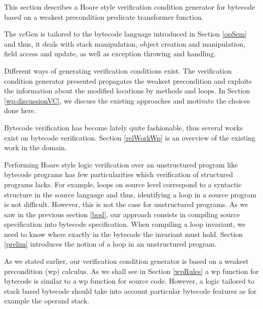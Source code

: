 
This section describes a Hoare style verification condition generator for bytecode based on a weakest precondition predicate transformer function.
 

The vcGen is tailored to the bytecode language introduced in Section \ref{opSem} and thus, it deals
with stack manipulation, object creation and manipulation, field access and update, as well as exception throwing and handling.

Different ways of generating verification conditions exist. The verification condition
 generator presented  propagates the weakest precondition and exploits the information 
about the modified locations by methods and loops. 
In Section \ref{wp:discussionVC}, we discuss the existing approaches and motivate the choices done here.

Bytecode verification has become lately quite fashionable, thus several works exist on bytecode verification. Section \ref{relWorkWp}
is an overview of the existing work in the domain.



Performing Hoare style logic verification over an unstructured program like bytecode programs has few particularities which
verification of structured programs lacks. For example, loops on source level correspond to a syntactic structure in the source language and thus, identifying
a loop in a source program is not difficult.  However, this is not the case for unstructured programs. 
As we saw in the previous section \ref{bcsl}, our approach consists in compiling source specification into
bytecode specification. When compiling a loop invariant, we need to know where exactly in the bytecode the invariant must hold.
Section \ref{prelim} introduces the notion of a loop in an unstructured program.

As we stated earlier, our verification condition generator is based on a weakest precondition (wp) calculus. As we shall see in Section  \ref{wpRules}
a wp function for bytecode is similar to a wp function for source code. However, a logic tailored to stack based bytecode should take into account 
particular bytecode features as for example the operand stack.



 





 
